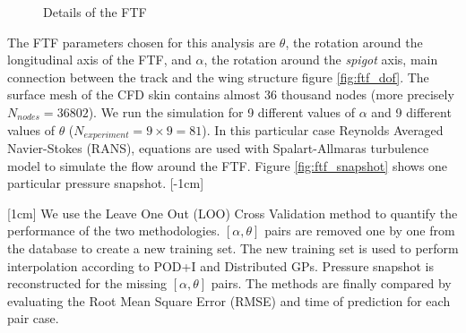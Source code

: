 \begin{figure}[!ht]
  \centering
  \quad
  \quad
      \caption{Details of the FTF}
\end{figure}

The FTF parameters chosen for this analysis are $\theta$, the rotation around the longitudinal axis of the FTF, and $\alpha$, the rotation around the {\it spigot} axis, main connection between the track and the wing structure figure \ref{fig:ftf_dof}. The surface mesh of the CFD skin contains almost 36 thousand nodes (more precisely $N_{nodes} = 36802$). We run the simulation for 9 different values of $\alpha$ and 9 different values of $\theta$ ($N_{experiment} = 9\times9 = 81$). In this particular case Reynolds Averaged  Navier-Stokes (RANS), equations are used with Spalart-Allmaras turbulence model to simulate the flow around the FTF. Figure \ref{fig:ftf_snapshot} shows one particular pressure snapshot. 
[-1cm]

[1cm]
We use the Leave One Out (LOO) Cross Validation method to quantify the performance of the two methodologies. $[\alpha, \theta]$ pairs are removed one by one from the database to create a new training set. The new training set is used to perform interpolation according to POD+I and Distributed GPs. Pressure snapshot is reconstructed for the missing $[\alpha, \theta]$ pairs. The methods are finally compared by evaluating the Root Mean Square Error (RMSE) and time of prediction for each pair case. 

